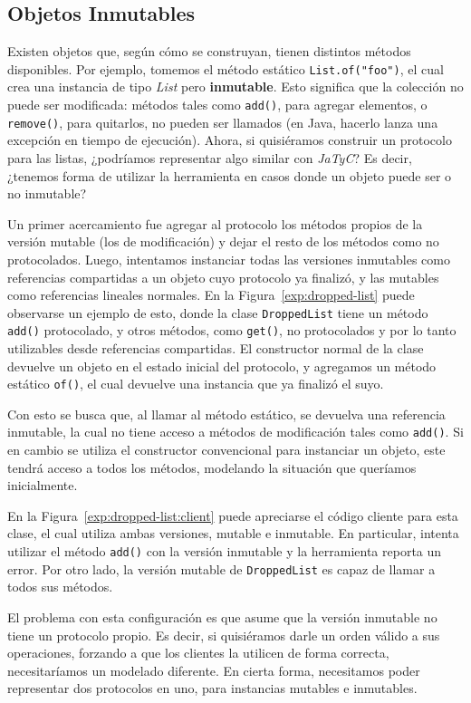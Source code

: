 \subsection{Objetos Inmutables}

Existen objetos que, según cómo se construyan, tienen distintos métodos disponibles. Por ejemplo, tomemos el método estático \texttt{List.of("foo")}, el cual crea una instancia de tipo \textit{List} pero \textbf{inmutable}. Esto significa que la colección no puede ser modificada: métodos tales como \texttt{add()}, para agregar elementos, o \texttt{remove()}, para quitarlos, no pueden ser llamados (en Java, hacerlo lanza una excepción en tiempo de ejecución). Ahora, si quisiéramos construir un protocolo para las listas, ¿podríamos representar algo similar con \textit{JaTyC}? Es decir, ¿tenemos forma de utilizar la herramienta en casos donde un objeto puede ser o no inmutable?

Un primer acercamiento fue agregar al protocolo los métodos propios de la versión mutable (los de modificación) y dejar el resto de los métodos como no protocolados. Luego, intentamos instanciar todas las versiones inmutables como referencias compartidas a un objeto cuyo protocolo ya finalizó, y las mutables como referencias lineales normales. En la Figura~\ref{exp:dropped-list} puede observarse un ejemplo de esto, donde la clase \texttt{DroppedList} tiene un método \texttt{add()} protocolado, y otros métodos, como \texttt{get()}, no protocolados y por lo tanto utilizables desde referencias compartidas. El constructor normal de la clase devuelve un objeto en el estado inicial del protocolo, y agregamos un método estático \texttt{of()}, el cual devuelve una instancia que ya finalizó el suyo.

Con esto se busca que, al llamar al método estático, se devuelva una referencia inmutable, la cual no tiene acceso a métodos de modificación tales como \texttt{add()}. Si en cambio se utiliza el constructor convencional para instanciar un objeto, este tendrá acceso a todos los métodos, modelando la situación que queríamos inicialmente.

En la Figura~\ref{exp:dropped-list:client} puede apreciarse el código cliente para esta clase, el cual utiliza ambas versiones, mutable e inmutable. En particular, intenta utilizar el método \texttt{add()} con la versión inmutable y la herramienta reporta un error. Por otro lado, la versión mutable de \texttt{DroppedList} es capaz de llamar a todos sus métodos.

El problema con esta configuración es que asume que la versión inmutable no tiene un protocolo propio. Es decir, si quisiéramos darle un orden válido a sus operaciones, forzando a que los clientes la utilicen de forma correcta, necesitaríamos un modelado diferente. En cierta forma, necesitamos poder representar dos protocolos en uno, para instancias mutables e inmutables.

